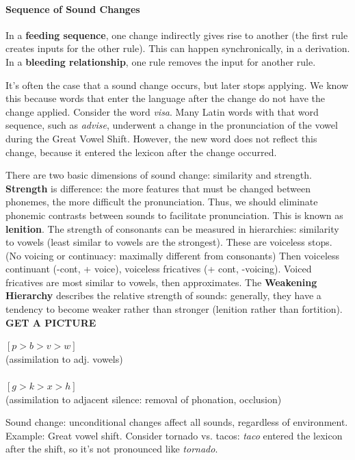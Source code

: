 \documentclass{exam}
\newcommand{\morespace}{\vspace{+2mm}}
\begin{document}
\paragraph{Sequence of Sound Changes} In a \textbf{feeding sequence}, one change indirectly gives rise to another (the first rule creates inputs for the other rule). This can happen synchronically, in a derivation. In a \textbf{bleeding relationship}, one rule removes the input for another rule.

It's often the case that a sound change occurs, but later stops applying. We know this because words that enter the language after the change do not have the change applied. Consider the word \textit{visa}. Many Latin words with that word sequence, such as \textit{advise}, underwent a change in the pronunciation of the vowel during the Great Vowel Shift. However, the new word does not reflect this change, because it entered the lexicon after the change occurred. 

There are two basic dimensions of sound change: similarity and strength. 
\textbf{Strength} is difference: the more features that must be changed between phonemes, the more difficult the pronunciation. 
Thus, we should eliminate phonemic contrasts between sounds to facilitate pronunciation. 
This is known as \textbf{lenition}. 
The strength of consonants can be measured in hierarchies: similarity to vowels (least similar to vowels are the strongest). 
These are voiceless stops. 
(No voicing or continuacy: maximally different from consonants) Then voiceless continuant (-cont, + voice), voiceless fricatives (+ cont, -voicing). 
Voiced fricatives are most similar to vowels, then approximates. The \textbf{Weakening Hierarchy} describes the relative strength of sounds: generally, they have a tendency to become weaker rather than stronger (lenition rather than fortition). 
\textbf{GET A PICTURE}

\begin{center}

$[p>b>v>w]$ \\(assimilation to adj. vowels)\\\\\morespace
$[g>k>x>h]$ \\(assimilation to adjacent silence: removal of phonation, occlusion)

\end{center}

Sound change: unconditional changes affect all sounds, regardless of environment. Example: Great vowel shift. Consider tornado vs. tacos: \textit{taco} entered the lexicon after the shift, so it's not pronounced like \textit{tornado}.
\end{document}
